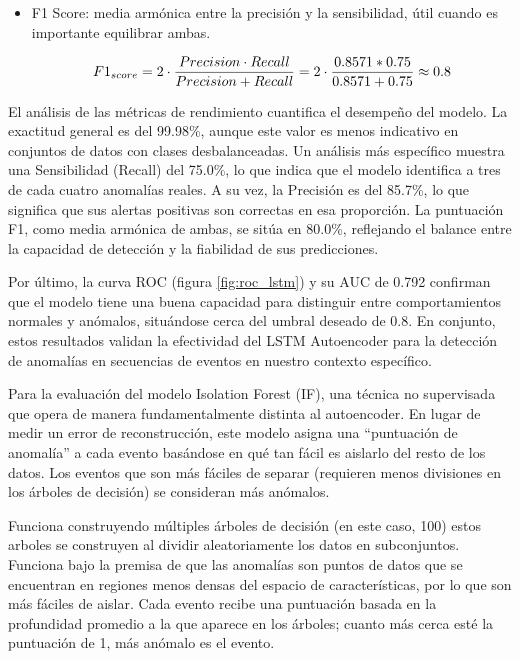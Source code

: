 \begin{itemize}
      \item F1 Score: media armónica entre la precisión y la sensibilidad, útil cuando es importante equilibrar ambas.

            \begin{align}
                  F1_{score} = 2 \cdot \frac{Precision \cdot Recall}{Precision + Recall} = 2 \cdot \frac{0.8571 * 0.75}{0.8571+0.75} \approx 0.8 \notag \\
                  \label{eq:f1score}
            \end{align}

\end{itemize}

El análisis de las métricas de rendimiento cuantifica el desempeño del modelo. La exactitud general es del 99.98\%, aunque este valor es menos indicativo en conjuntos de datos con clases desbalanceadas. Un análisis más específico muestra una Sensibilidad (Recall) del 75.0\%, lo que indica que el modelo identifica a tres de cada cuatro anomalías reales. A su vez, la Precisión es del 85.7\%, lo que significa que sus alertas positivas son correctas en esa proporción. La puntuación F1, como media armónica de ambas, se sitúa en 80.0\%, reflejando el balance entre la capacidad de detección y la fiabilidad de sus predicciones.

Por último, la curva ROC (figura \ref{fig:roc_lstm}) y su AUC de 0.792 confirman que el modelo tiene una buena capacidad para distinguir entre comportamientos normales y anómalos, situándose cerca del umbral deseado de 0.8. En conjunto, estos resultados validan la efectividad del LSTM Autoencoder para la detección de anomalías en secuencias de eventos en nuestro contexto específico.


Para la  evaluación del modelo Isolation Forest (IF), una técnica no supervisada que opera de manera fundamentalmente distinta al autoencoder. En lugar de medir un error de reconstrucción, este modelo asigna una ``puntuación de anomalía'' a cada evento basándose en qué tan fácil es aislarlo del resto de los datos. Los eventos que son más fáciles de separar (requieren menos divisiones en los árboles de decisión) se consideran más anómalos.

Funciona construyendo múltiples árboles de decisión (en este caso, 100) estos arboles se construyen al dividir aleatoriamente los datos en subconjuntos. Funciona bajo la premisa de que las anomalías son puntos de datos que se encuentran en regiones menos densas del espacio de características, por lo que son más fáciles de aislar. Cada evento recibe una puntuación basada en la profundidad promedio a la que aparece en los árboles; cuanto más cerca esté la puntuación de 1, más anómalo es el evento.

